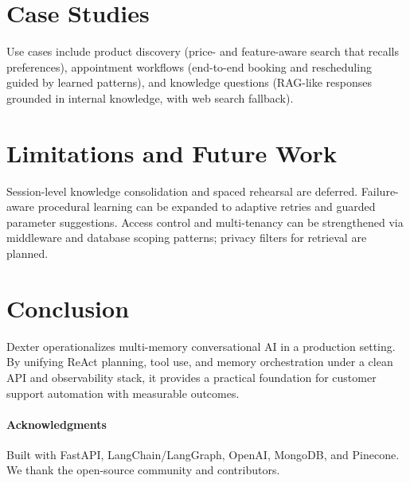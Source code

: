 \documentclass[11pt]{article}
\begin{document}
\section{Case Studies}
Use cases include product discovery (price- and feature-aware search that recalls preferences), appointment workflows (end-to-end booking and rescheduling guided by learned patterns), and knowledge questions (RAG-like responses grounded in internal knowledge, with web search fallback).

\section{Limitations and Future Work}
Session-level knowledge consolidation and spaced rehearsal are deferred. Failure-aware procedural learning can be expanded to adaptive retries and guarded parameter suggestions. Access control and multi-tenancy can be strengthened via middleware and database scoping patterns; privacy filters for retrieval are planned.

\section{Conclusion}
Dexter operationalizes multi-memory conversational AI in a production setting. By unifying ReAct planning, tool use, and memory orchestration under a clean API and observability stack, it provides a practical foundation for customer support automation with measurable outcomes.

\paragraph{Acknowledgments} Built with FastAPI, LangChain/LangGraph, OpenAI, MongoDB, and Pinecone. We thank the open-source community and contributors.



\end{document}

